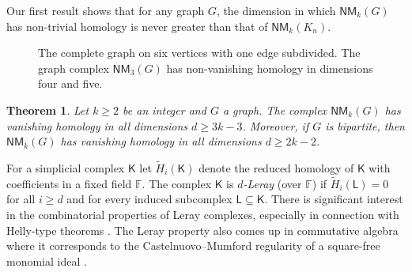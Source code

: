 \documentclass[10pt]{amsart}
\newcommand{\NM}{\mathsf{NM}}
\newtheorem{thm}{Theorem}[section]
\theoremstyle{definition}
\begin{document}
	Our first result shows that for any graph $G$, the dimension in which $\mathsf{NM}_k(G)$ has non-trivial homology is never greater than that of $\mathsf{NM}_k(K_n)$.
	\begin{figure}
		\centering
		\caption{\small The complete graph on six vertices with one edge subdivided. The graph complex $\mathsf{NM}_3(G)$ has non-vanishing homology in dimensions four and five.}
		\label{fig:non-vanish}
	\end{figure}
	
	
	
	\begin{thm}\label{leray-result}
		Let $k\geq 2$ be an integer and $G$ a graph. The complex $\NM_k(G)$ has vanishing homology in all dimensions $d\geq 3k-3$. Moreover, if $G$ is bipartite, then $\NM_k(G)$ has vanishing homology in all dimensions $d\geq 2k-2$.
	\end{thm}
	For a simplicial complex $\mathsf{K}$ 	let $\tilde{H}_i(\mathsf{K})$ denote the reduced homology of $\mathsf{K}$ with coefficients in a fixed field $\mathbb{F}$. The complex $\mathsf{K}$ is  {\em $d$-Leray} (over $\mathbb{F}$) if $\tilde{H}_i(\mathsf{L}) = 0 $ for all $i\geq d$ and for every induced subcomplex $\mathsf{L}\subseteq \mathsf{K}$. There is significant interest in the
	combinatorial properties of Leray complexes, especially in connection with Helly-type theorems \cite{kalai1, kalai2, kalai-meshulam3, kalai-meshulam1, colin}. The Leray property also comes up in commutative algebra where it corresponds to the Castelnuovo--Mumford regularity of a square-free monomial ideal \cite{kalai-meshulam2}.
	
\end{document}
